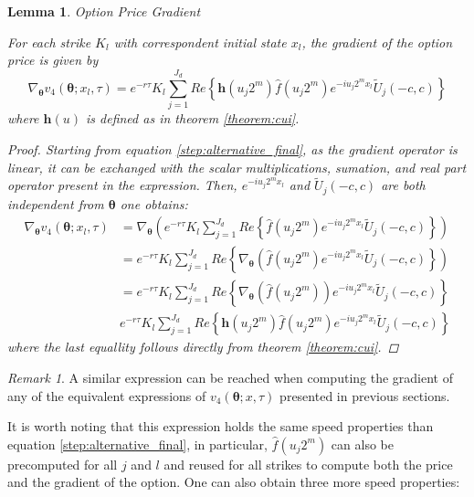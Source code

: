 \documentclass[12,twoside]{mammeTFM}
\newtheorem{lem}[thm]{Lemma}
\theoremstyle{definition}
\theoremstyle{remark}
\newtheorem{remark}[thm]{Remark}
\begin{document}
\begin{lem} Option Price Gradient

For each strike $K_l$ with correspondent initial state $x_l$, the gradient of the option price is given by
\begin{equation}
\nabla_{\boldsymbol{\theta}} v_4(\boldsymbol{\theta}; x_l, \tau) = 
e^{-r\tau} K_l \sum_{j=1}^{J_d} Re \left\{ \boldsymbol{h}(u_j 2^m) \hat{f}(u_j 2^m) e^{-i u_j 2^m x_l} \tilde{U}_j(-c,c) \right\}
\end{equation}
where $\boldsymbol{h}(u)$ is defined as in theorem \ref{theorem:cui}.
\begin{proof}
Starting from equation \ref{step:alternative_final}, as the gradient operator is linear, it can be exchanged with the scalar multiplications, sumation, and real part operator present in the expression. Then, $e^{-i u_j 2^m x_l}$ and $\tilde{U}_j(-c,c)$ are both independent from $\boldsymbol{\theta}$ one obtains:
\begin{equation}
\begin{aligned}
\nabla_{\boldsymbol{\theta}}v_4(\boldsymbol{\theta}; x_l, \tau) &= \nabla_{\boldsymbol{\theta}} \left(e^{-r\tau}K_l \sum_{j=1}^{J_d} Re \left\{ \hat{f}(u_j 2^m) e^{-i u_j 2^m x_l} \tilde{U}_j(-c,c) \right\} \right)\\
&= e^{-r\tau}K_l \sum_{j=1}^{J_d} Re \left\{ \nabla_{\boldsymbol{\theta}} \left(\hat{f}(u_j 2^m) e^{-i u_j 2^m x_l} \tilde{U}_j(-c,c) \right\} \right)\\
&= e^{-r\tau}K_l \sum_{j=1}^{J_d} Re \left\{ \nabla_{\boldsymbol{\theta}} \left(\hat{f}(u_j 2^m) \right) e^{-i u_j 2^m x_l} \tilde{U}_j(-c,c) \right\} \\
& e^{-r\tau} K_l \sum_{j=1}^{J_d} Re \left\{ \boldsymbol{h}(u_j 2^m) \hat{f}(u_j 2^m) e^{-i u_j 2^m x_l} \tilde{U}_j(-c,c) \right\}
\end{aligned}
\end{equation}
where the last equallity follows directly from theorem \ref{theorem:cui}.
\end{proof}
\end{lem}

\begin{remark}
A similar expression can be reached when computing the gradient of any of the equivalent expressions of $v_4(\boldsymbol{\theta}; x, \tau)$ presented in previous sections. 
\end{remark}

It is worth noting that this expression holds the same speed properties than equation \ref{step:alternative_final}, in particular, $\hat{f}(u_j 2^m)$ can also be precomputed for all $j$ and $l$ and reused for all strikes to compute both the price and the gradient of the option. One can also obtain three more speed properties:
\end{document}
